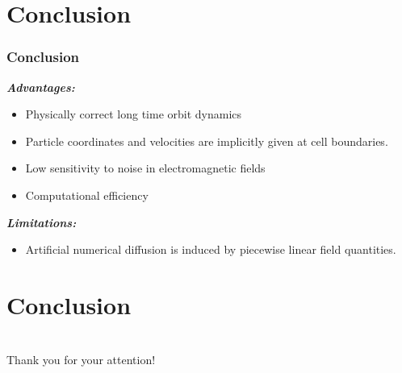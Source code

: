 \documentclass{beamer}
\begin{document}
\section{Conclusion}
\begin{frame}
\frametitle{Conclusion}
\vspace*{-0.5cm}
\textit{\textbf{Advantages:}}\\
\begin{itemize}
\item Physically correct long time orbit dynamics
\item Particle coordinates and velocities are implicitly given at cell boundaries.
\item Low sensitivity to noise in electromagnetic fields
\item Computational efficiency
\end{itemize}
\textit{\textbf{Limitations:}}
\begin{itemize}
\item Artificial numerical diffusion is induced by piecewise linear field quantities.
\end{itemize}
\end{frame}

\section{Conclusion}



\section{ }
 \begin{frame}
\vspace*{2.5cm}
\centerline{\huge Thank you for your attention!}
 \end{frame}



\end{document}

